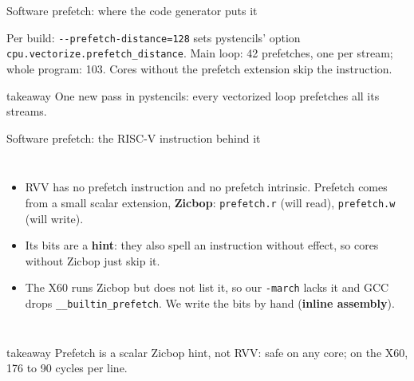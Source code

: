 \documentclass[aspectratio=169,10pt,t]{beamer}
\newcommand{\term}[1]{\textcolor{psblue!85!black}{\textbf{#1}}} %
\newcommand{\code}[1]{\texttt{#1}}
\newcommand{\takeaway}[1]{\par\vfill
  \begin{beamercolorbox}[wd=\textwidth,sep=4pt,rounded=true]{takeaway}
    \small #1
  \end{beamercolorbox}}
\begin{document}
\begin{frame}{Software prefetch: where the code generator puts it}
  \vspace{0.5mm}
  \centering

  \vspace{2mm}
  {\scriptsize\color{psgray}Per build: \code{-{}-prefetch-distance=128} sets pystencils' option
  \code{cpu.vectorize.prefetch\_distance}. Main loop: 42 prefetches, one per stream; whole program: 103.
  Cores without the prefetch extension skip the instruction.\par}
  \takeaway{One new pass in pystencils: every vectorized loop prefetches all its streams.}
\end{frame}

\begin{frame}{Software prefetch: the RISC-V instruction behind it}
  \begin{columns}[T,onlytextwidth]
    
    \vspace{1mm}
    \begin{itemize}\small
      \item RVV has no prefetch instruction and no prefetch intrinsic. Prefetch comes from a small
            scalar extension, \term{Zicbop}: \code{prefetch.r} (will read), \code{prefetch.w} (will write).
      \item Its bits are a \term{hint}: they also spell an instruction without effect, so cores
            without Zicbop just skip it.
      \item The X60 runs Zicbop but does not list it, so our \code{-march} lacks it and GCC drops
            \code{\_\_builtin\_prefetch}. We write the bits by hand (\term{inline assembly}).
    \end{itemize}
  \end{columns}
  \takeaway{Prefetch is a scalar Zicbop hint, not RVV: safe on any core; on the X60, 176 to 90 cycles per line.}
\end{frame}
\end{document}
